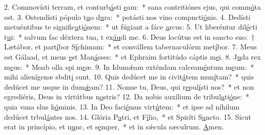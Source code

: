 2. Commovísti terram, et conturb\uline{á}sti \uline{e}am:~* sana contritiónes ejus, qui comm\uline{ó}ta est.
3. Ostendísti pópulo t\uline{u}o d\uline{u}ra:~* potásti nos vino compncti\uline{ó}nis.
4. Dedísti metuéntibus te signific\uline{a}ti\uline{ó}nem:~* ut fúgiant a fáce \uline{a}rcus:
5. Ut liberéntur dil\uline{é}cti t\uline{u}i:~* salvum fac déxtera tua, t ex\uline{áu}di me.
6. Deus locútus est in sancto suo:~† Lætábor, et part\uline{í}bor S\uline{í}chimam:~* et convállem tabernaculórm met\uline{í}bor.
7. Meus est Gálaad, et meus \uline{e}st Man\uline{á}sses:~* et Ephraim fortitúdo cáptis m\uline{e}i.
8. J\uline{u}da rex m\uline{e}us:~* Moab olla spi m\uline{e}æ.
9. In Idumǽam exténdam calceam\uline{é}ntum m\uline{e}um:~* mihi alienígenæ sbdit\uline{i} sunt.
10. Quis dedúcet me in civit\uline{á}tem mun\uline{í}tam?~* quis dedúcet me usque in dum\uline{ǽ}am?
11. Nonne tu, Deus, qui r\uline{e}pul\uline{í}sti nos?~* et non egrediéris, Deus in virtútbus n\uline{o}stris?
12. Da nobis auxílium de tribul\uline{a}ti\uline{ó}ne:~* quia vana slus h\uline{ó}minis.
13. In Deo faci\uline{é}mus virt\uline{ú}tem:~* et ipse ad níhilum dedúcet trbul\uline{á}ntes nos.
14. Glória P\uline{a}tri, et F\uline{í}lio,~* et Spiríti S\uline{a}ncto.
15. Sicut erat in princípio, et n\uline{u}nc, et s\uline{e}mper,~* et in sǽcula sæculrum. \uline{A}men.
